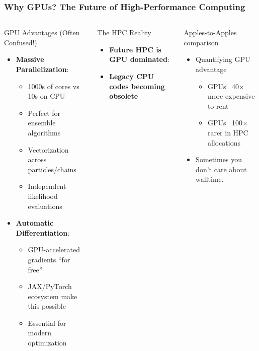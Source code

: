 \documentclass[aspectratio=169]{beamer}
\begin{document}
\begin{frame}
    \frametitle{Why GPUs? The Future of High-Performance Computing}
    \begin{columns}
        \begin{block}{GPU Advantages (Often Confused!)}
            \begin{itemize}
                \item \textbf{Massive Parallelization}:
                    \begin{itemize}
                        \item 1000s of cores vs 10s on CPU
                        \item Perfect for ensemble algorithms
                        \item Vectorization across particles/chains
                        \item Independent likelihood evaluations
                    \end{itemize}
                \item \textbf{Automatic Differentiation}:
                    \begin{itemize}
                        \item GPU-accelerated gradients ``for free''
                        \item JAX/PyTorch ecosystem make this possible
                        \item Essential for modern optimization
                    \end{itemize}
            \end{itemize}
        \end{block}
        \begin{block}{The HPC Reality}
            \begin{itemize}
                \item \textbf{Future HPC is GPU dominated}:
                \item \textbf{Legacy CPU codes becoming obsolete}
            \end{itemize}
        \end{block}
        \begin{block}{Apples-to-Apples comparison}
            \begin{itemize}
                \item Quantifying GPU advantage
                    \begin{itemize}
                        \item GPUs ~40× more expensive to rent
                        \item GPUs ~100× rarer in HPC allocations
                    \end{itemize}
                \item Sometimes you don't care about walltime.
            \end{itemize}
        \end{block}
    \end{columns}
\end{frame}
\end{document}
